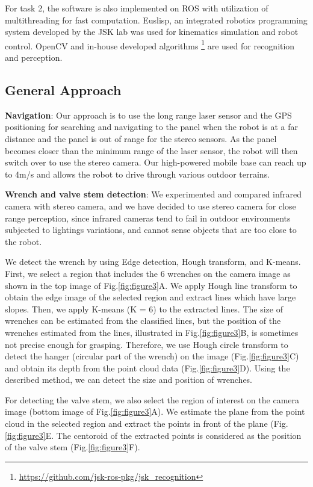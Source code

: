 \documentclass{standalone}
\begin{document}
For task 2, the software is also implemented on ROS with utilization of multithreading for fast computation. Euslisp, an integrated robotics programming system developed by the JSK lab was used for kinematics simulation and robot control. OpenCV and in-house developed algorithms
 \footnote{\url{https://github.com/jsk-ros-pkg/jsk_recognition}} are used for recognition and perception.

 \subsection{General Approach}
 \textbf{Navigation}: Our approach is to use the long range laser sensor and the GPS positioning for searching and navigating to the panel when the robot is at a far distance and the panel is out of range for the stereo sensors.  %
As the panel becomes closer than the minimum range of the laser sensor, the robot will then switch over to use the stereo camera. Our high-powered mobile base can reach up to 4m/s and allows the robot to drive through various outdoor terrains. 

\textbf{Wrench and valve stem detection}: We experimented and compared infrared camera with stereo camera, and we have decided to use stereo camera for close range perception, since infrared cameras tend to fail in outdoor environments subjected to lightings variations, and cannot sense objects that are too close to the robot. 

We detect the wrench by using Edge detection, Hough transform, and K-means. First, we select a region that includes the 6 wrenches on the camera image as shown in the top image of Fig.\ref{fig:figure3}A. We apply Hough line transform to obtain the edge image of the selected region and extract lines which have large slopes. Then, we apply K-means (K = 6) to the extracted lines. The size of wrenches can be estimated from the classified lines, but the position of the wrenches estimated from the lines, illustrated in Fig.\ref{fig:figure3}B, is sometimes not precise enough for grasping. Therefore, we use Hough circle transform to detect the hanger (circular part of the wrench) on the image (Fig.\ref{fig:figure3}C) and obtain its depth from the point cloud data (Fig.\ref{fig:figure3}D). Using the described method, we can detect the size and position of wrenches. 

For detecting the valve stem, we also select the region of interest on the camera image (bottom image of Fig.\ref{fig:figure3}A). We estimate the plane from the point cloud in the selected region and extract the points in front of the plane (Fig.\ref{fig:figure3}E. The centoroid of the extracted points is considered as the position of the valve stem (Fig.\ref{fig:figure3}F).
\end{document}
